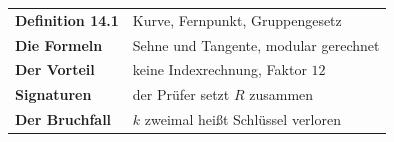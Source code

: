 \begin{merksatz}
\begin{center}
\renewcommand{\arraystretch}{1.5}
\begin{tabular}{@{}P{3.0cm}P{5.6cm}@{}}
\toprule
\textbf{Definition 14.1} & Kurve, Fernpunkt, Gruppengesetz\\
\textbf{Die Formeln} & Sehne und Tangente, modular gerechnet\\
\textbf{Der Vorteil} & keine Indexrechnung, Faktor $12$\\
\textbf{Signaturen} & der Prüfer setzt $R$ zusammen\\
\textbf{Der Bruchfall} & $k$ zweimal heißt Schlüssel verloren\\
\bottomrule
\end{tabular}
\end{center}

\begin{center}
\begin{minipage}{0.88\textwidth}
\end{minipage}
\end{center}
\end{merksatz}
